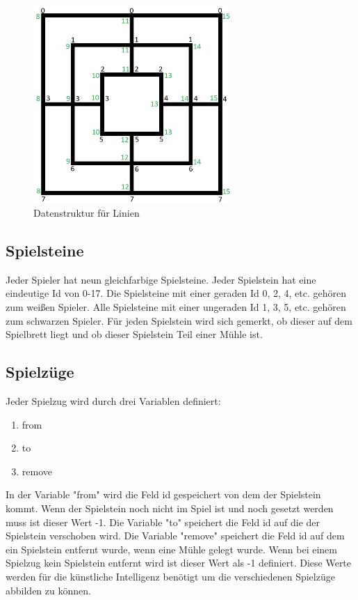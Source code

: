 \documentclass[oneside]{ausarbeitung}
\begin{document}
\begin{figure}[ht]
	\centering
	\includegraphics[width=7.5cm,height=7.5cm]{images/gameboardLines.png}
	\caption[Datenstruktur für Linien]{Datenstruktur für Linien}
\end{figure}

\subsection{Spielsteine}

Jeder Spieler hat neun gleichfarbige Spielsteine. Jeder Spielstein hat eine eindeutige Id von 0-17. Die Spielsteine mit einer geraden Id 0, 2, 4, etc. gehören zum weißen Spieler. Alle Spielsteine mit einer ungeraden Id 1, 3, 5, etc. gehören zum schwarzen Spieler. Für jeden Spielstein wird sich gemerkt, ob dieser auf dem Spielbrett liegt und ob dieser Spielstein Teil einer Mühle ist.

\subsection{Spielzüge}

Jeder Spielzug wird durch drei Variablen definiert:

\begin{enumerate}
\item from
\item to
\item remove
\end{enumerate}

In der Variable "from" wird die Feld id gespeichert von dem der Spielstein kommt. Wenn der Spielstein noch nicht im Spiel ist und noch gesetzt werden muss ist dieser Wert -1. Die Variable "to" speichert die Feld id auf die der Spielstein verschoben wird. Die Variable "remove" speichert die Feld id auf dem ein Spielstein entfernt wurde, wenn eine Mühle gelegt wurde. Wenn bei einem Spielzug kein Spielstein entfernt wird ist dieser Wert als -1 definiert. Diese Werte werden für die künstliche Intelligenz benötigt um die verschiedenen Spielzüge abbilden zu können.
\end{document}

